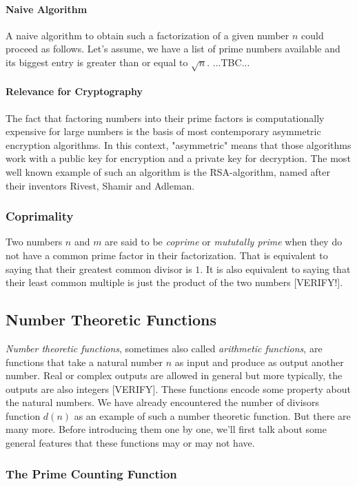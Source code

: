 
\paragraph{Naive Algorithm} A naive algorithm to obtain such a factorization of a given number $n$ could proceed as follows. Let's assume, we have a list of prime numbers available and its biggest entry is greater than or equal to $\sqrt{n}$. ...TBC...


\paragraph{Relevance for Cryptography} The fact that factoring numbers into their prime factors is computationally expensive for large numbers is the basis of most contemporary asymmetric encryption algorithms. In this context, "asymmetric" means that those algorithms work with a public key for encryption and a private key for decryption. The most well known example of such an algorithm is the RSA-algorithm, named after their inventors Rivest, Shamir and Adleman.


\subsubsection{Coprimality}
Two numbers $n$ and $m$ are said to be \emph{coprime} or \emph{mututally prime} when they do not have a common prime factor in their factorization. That is equivalent to saying that their greatest common divisor is $1$. It is also equivalent to saying that their least common multiple is just the product of the two numbers [VERIFY!].


\subsection{Number Theoretic Functions}
\emph{Number theoretic functions}, sometimes also called \emph{arithmetic functions}, are functions that take a natural number $n$ as input and produce as output another number. Real or complex outputs are allowed in general but more typically, the outputs are also integers [VERIFY]. These functions encode some property about the natural numbers. We have already encountered the number of divisors function $d(n)$ as an example of such a number theoretic function. But there are many more. Before introducing them one by one, we'll first talk about some general features that these functions may or may not have.


\subsubsection{The Prime Counting Function}



